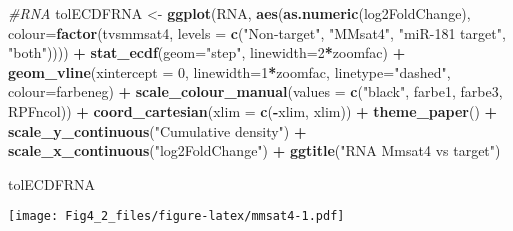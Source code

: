 \documentclass[
]{article}
\newenvironment{Shaded}{\begin{snugshade}}{\end{snugshade}}
\newcommand{\AttributeTok}[1]{\textcolor[rgb]{0.13,0.29,0.53}{#1}}
\newcommand{\CommentTok}[1]{\textcolor[rgb]{0.56,0.35,0.01}{\textit{#1}}}
\newcommand{\DecValTok}[1]{\textcolor[rgb]{0.00,0.00,0.81}{#1}}
\newcommand{\FunctionTok}[1]{\textcolor[rgb]{0.13,0.29,0.53}{\textbf{#1}}}
\newcommand{\NormalTok}[1]{#1}
\newcommand{\OtherTok}[1]{\textcolor[rgb]{0.56,0.35,0.01}{#1}}
\newcommand{\SpecialCharTok}[1]{\textcolor[rgb]{0.81,0.36,0.00}{\textbf{#1}}}
\newcommand{\StringTok}[1]{\textcolor[rgb]{0.31,0.60,0.02}{#1}}
\begin{document}
\begin{Shaded}
\begin{Highlighting}[]
\CommentTok{\#RNA}
\NormalTok{tolECDFRNA }\OtherTok{\textless{}{-}} \FunctionTok{ggplot}\NormalTok{(RNA, }\FunctionTok{aes}\NormalTok{(}\FunctionTok{as.numeric}\NormalTok{(log2FoldChange), }\AttributeTok{colour=}\FunctionTok{factor}\NormalTok{(tvsmmsat4, }\AttributeTok{levels =} \FunctionTok{c}\NormalTok{(}\StringTok{"Non{-}target"}\NormalTok{, }\StringTok{"MMsat4"}\NormalTok{, }\StringTok{"miR{-}181 target"}\NormalTok{, }\StringTok{"both"}\NormalTok{)))) }\SpecialCharTok{+} 
  \FunctionTok{stat\_ecdf}\NormalTok{(}\AttributeTok{geom=}\StringTok{"step"}\NormalTok{, }\AttributeTok{linewidth=}\DecValTok{2}\SpecialCharTok{*}\NormalTok{zoomfac) }\SpecialCharTok{+}
  \FunctionTok{geom\_vline}\NormalTok{(}\AttributeTok{xintercept =} \DecValTok{0}\NormalTok{, }\AttributeTok{linewidth=}\DecValTok{1}\SpecialCharTok{*}\NormalTok{zoomfac, }\AttributeTok{linetype=}\StringTok{"dashed"}\NormalTok{, }\AttributeTok{colour=}\NormalTok{farbeneg) }\SpecialCharTok{+}
  \FunctionTok{scale\_colour\_manual}\NormalTok{(}\AttributeTok{values =} \FunctionTok{c}\NormalTok{(}\StringTok{"black"}\NormalTok{, farbe1, farbe3, RPFncol)) }\SpecialCharTok{+}
  \FunctionTok{coord\_cartesian}\NormalTok{(}\AttributeTok{xlim =} \FunctionTok{c}\NormalTok{(}\SpecialCharTok{{-}}\NormalTok{xlim, xlim)) }\SpecialCharTok{+} 
  \FunctionTok{theme\_paper}\NormalTok{() }\SpecialCharTok{+}
  \FunctionTok{scale\_y\_continuous}\NormalTok{(}\StringTok{"Cumulative density"}\NormalTok{) }\SpecialCharTok{+} \FunctionTok{scale\_x\_continuous}\NormalTok{(}\StringTok{"log2FoldChange"}\NormalTok{) }\SpecialCharTok{+}
  \FunctionTok{ggtitle}\NormalTok{(}\StringTok{"RNA Mmsat4 vs target"}\NormalTok{)}

\NormalTok{tolECDFRNA}
\end{Highlighting}
\end{Shaded}

\texttt{[image: Fig4\_2\_files/figure-latex/mmsat4-1.pdf]}
\end{document}
